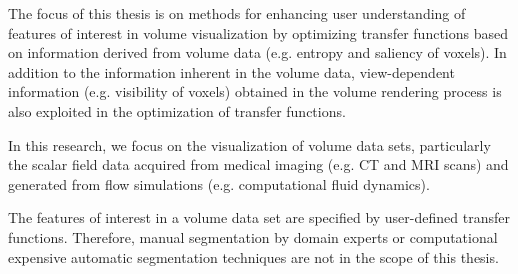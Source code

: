 The focus of this thesis is on methods for enhancing user understanding of features of interest in volume visualization by optimizing transfer functions based on information derived from volume data (e.g. entropy and saliency of voxels). In addition to the information inherent in the volume data, view-dependent information (e.g. visibility of voxels) obtained in the volume rendering process is also exploited in the optimization of transfer functions.

In this research, we focus on the visualization of volume data sets, particularly the scalar field data acquired from medical imaging (e.g. CT and MRI scans) and generated from flow simulations (e.g. computational fluid dynamics).

The features of interest in a volume data set are specified by user-defined transfer functions.
Therefore, manual segmentation by domain experts or computational expensive automatic segmentation techniques are not in the scope of this thesis.


